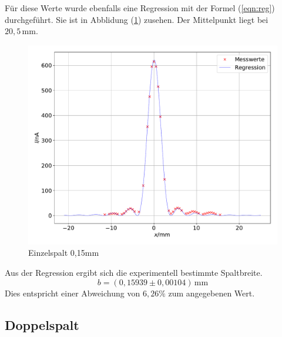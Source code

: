 Für diese Werte wurde ebenfalls eine Regression mit der Formel (\ref{eqn:reg}) durchgeführt.
Sie ist in Abblidung (\ref{fig:e15}) zusehen.
Der Mittelpunkt liegt bei $20,5\, \mathrm{mm}$.
\begin{figure}[H]
\centering
\includegraphics[width=\textwidth]{einzel15.pdf}
\caption{Einzelspalt 0,15mm}
\label{fig:e15}
\end{figure}
Aus der Regression ergibt sich die experimentell bestimmte Spaltbreite.
\begin{equation*}
  b = (0,15939 \pm 0,00104)\, \mathrm{mm}
\end{equation*}
Dies entspricht einer Abweichung von $6,26\%$ zum angegebenen Wert.
\newpage
\subsection{Doppelspalt}

